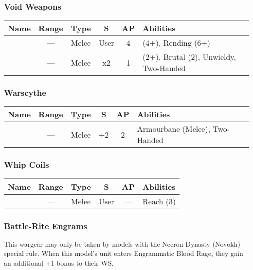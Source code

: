 \subsubsection{Void Weapons}

\label{Voidblade} \label{Voidscythe}
\noindent
\begin{NiceTabular}{L{115 pt} c C{40pt} *{2}{c} >{\raggedright\arraybackslash}p{240pt}}
	Name & Range & Type & S & AP & Abilities \\
	\hline
	 & — & Melee & User & 4 &  (4+), Rending (6+) \\
	  & — & Melee & x2 & 1 &  (2+), Brutal (2), Unwieldy, Two-Handed \\
\end{NiceTabular}

\subsubsection{Warscythe}
\label{Warscythe}
\noindent
\begin{NiceTabular}{L{115 pt} c C{40pt} *{2}{c} >{\raggedright\arraybackslash}p{240pt}}
	Name & Range & Type & S & AP & Abilities \\
	\hline
	 & — & Melee & +2 & 2 & Armourbane (Melee), Two-Handed \\
\end{NiceTabular}

\subsubsection{Whip Coils}
\label{Whip Coils}
\noindent
\begin{NiceTabular}{L{115 pt} c C{40pt} *{2}{c} >{\raggedright\arraybackslash}p{240pt}}
	Name & Range & Type & S & AP & Abilities \\
	\hline
	 & — & Melee & User & — & Reach (3) \\
\end{NiceTabular}



 \label{Technoarcana}


\subsubsection{Battle-Rite Engrams} \label{Battle-Rite Engrams}

This wargear may only be taken by models with the Necron Dynasty (Novokh) special rule. When this model's unit enters Engrammatic Blood Rage, they gain an additional +1 bonus to their WS.

